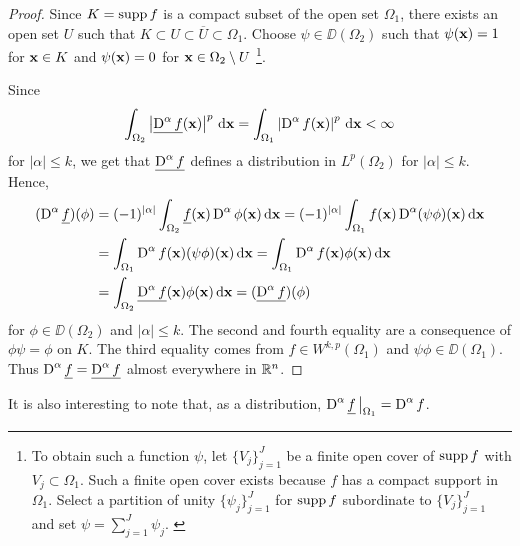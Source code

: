\begin{proof}
Since $K = \operatorname{supp} f$ is a compact subset of the open set $\Omega_1$,
there exists an open set $U$ such that
$K \subset U \subset \overline{U} \subset \Omega_1$.
Choose $\psi \in \DD(\Omega_2)$ such that
$\psi(\mathbf{x}) = 1$ for $\mathbf{x} \in K$ and $\psi(\mathbf{x}) = 0$ for
$\mathbf{x} \in \Omega_2 \setminus U$
\footnote{
To obtain such a function $\psi$, let $\displaystyle \{V_j\}_{j=1}^J$
be a finite open cover of $\operatorname{supp} f$ with $V_j \subset \Omega_1$.  Such a
finite open cover exists because $f$ has a compact support in
$\Omega_1$.  Select a partition of unity
$\displaystyle \{\psi_j\}_{j=1}^J$ for $\operatorname{supp} f$
subordinate to $\displaystyle \{V_j\}_{j=1}^J$ and set
$\displaystyle \psi = \sum_{j=1}^J \psi_j$. \label{FOOTNOTE1}}.

Since
\[
\int_{\Omega_2} \left|\underline{\operatorname{D}^\alpha f}(\mathbf{x})\right|^p
\,\mathrm{d}{\mathbf{x}} = 
\int_{\Omega_1} \left| \operatorname{D}^\alpha f(\mathbf{x}) \right|^p \,\mathrm{d}{\mathbf{x}} < \infty
\]
for $|\alpha|\leq k$, we get that
$\displaystyle \underline{\operatorname{D}^\alpha f}$ defines a
distribution in $\displaystyle L^p(\Omega_2)$ for $|\alpha|\leq k$.
Hence,
\begin{align*}
(\operatorname{D}^\alpha \underline{f})(\phi)
&= (-1)^{|\alpha|} \int_{\Omega_2} \underline{f}(\mathbf{x})
\operatorname{D}^\alpha \phi(\mathbf{x})\,\mathrm{d}{\mathbf{x}}
= (-1)^{|\alpha|} \int_{\Omega_1} f(\mathbf{x})
\operatorname{D}^\alpha (\psi \phi)(\mathbf{x})\,\mathrm{d}{\mathbf{x}} \\
&= \int_{\Omega_1} \operatorname{D}^\alpha f(\mathbf{x}) (\psi \phi)(\mathbf{x})\,\mathrm{d}{\mathbf{x}}
= \int_{\Omega_1} \operatorname{D}^\alpha f(\mathbf{x}) \phi(\mathbf{x})\,\mathrm{d}{\mathbf{x}} \\
&= \int_{\Omega_2} \underline{\operatorname{D}^\alpha f}(\mathbf{x}) \phi(\mathbf{x})\,\mathrm{d}{\mathbf{x}}
= (\underline{\operatorname{D}^\alpha f}) (\phi)
\end{align*}
for $\phi \in \DD(\Omega_2)$ and $|\alpha|\leq k$.  The second and fourth
equality are a consequence of $\phi \psi = \phi$ on $K$.  The third
equality comes from $\displaystyle f \in W^{k,p}(\Omega_1)$ and
$\psi \phi \in \DD(\Omega_1)$.
Thus $\displaystyle \operatorname{D}^\alpha \underline{f} = \underline{\operatorname{D}^\alpha f}$
almost everywhere in $\mathbb{R}^n$.
\end{proof}

It is also interesting to note that, as a distribution,
$\displaystyle \operatorname{D}^\alpha \underline{f}\,\big|_{\Omega_1} = \operatorname{D}^\alpha f$.

